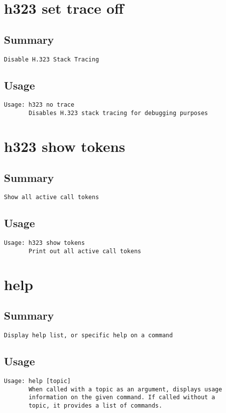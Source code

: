 \section{h323 set trace off}
\subsection{Summary}
\begin{verbatim}
Disable H.323 Stack Tracing
\end{verbatim}
\subsection{Usage}
\begin{verbatim}
Usage: h323 no trace
       Disables H.323 stack tracing for debugging purposes

\end{verbatim}


\section{h323 show tokens}
\subsection{Summary}
\begin{verbatim}
Show all active call tokens
\end{verbatim}
\subsection{Usage}
\begin{verbatim}
Usage: h323 show tokens
       Print out all active call tokens

\end{verbatim}


\section{help}
\subsection{Summary}
\begin{verbatim}
Display help list, or specific help on a command
\end{verbatim}
\subsection{Usage}
\begin{verbatim}
Usage: help [topic]
       When called with a topic as an argument, displays usage
       information on the given command. If called without a
       topic, it provides a list of commands.

\end{verbatim}



